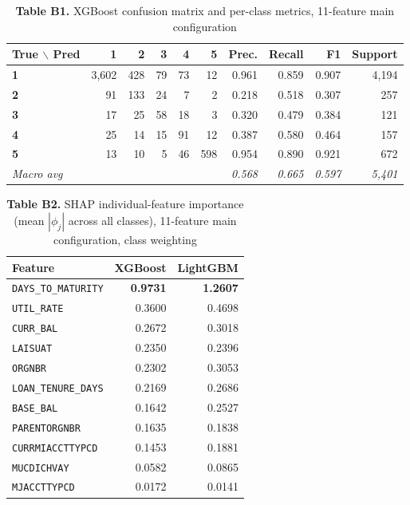 \documentclass[11pt,a4paper]{article}
\begin{document}
\begin{table}[H]
\centering
\caption*{\small\textbf{Table B1.} XGBoost confusion matrix and per-class metrics, 11-feature main configuration}
\small
\begin{tabular}{lrrrrrrrrr}
\toprule
True $\backslash$ Pred & 1 & 2 & 3 & 4 & 5 & Prec. & Recall & F1 & Support \\
\midrule
\textbf{1} & 3,602 & 428 & 79 & 73 & 12 & 0.961 & 0.859 & 0.907 & 4,194 \\
\textbf{2} & 91 & 133 & 24 & 7 & 2 & 0.218 & 0.518 & 0.307 & 257 \\
\textbf{3} & 17 & 25 & 58 & 18 & 3 & 0.320 & 0.479 & 0.384 & 121 \\
\textbf{4} & 25 & 14 & 15 & 91 & 12 & 0.387 & 0.580 & 0.464 & 157 \\
\textbf{5} & 13 & 10 & 5 & 46 & 598 & 0.954 & 0.890 & 0.921 & 672 \\
\midrule
\textit{Macro avg} & & & & & & \textit{0.568} & \textit{0.665} & \textit{0.597} & \textit{5,401} \\
\bottomrule
\end{tabular}
\end{table}

\begin{table}[H]
\centering
\caption*{\small\textbf{Table B2.} SHAP individual-feature importance (mean $|\phi_j|$ across all classes), 11-feature main configuration, class weighting}
\begin{tabular}{lrr}
\toprule
Feature & XGBoost & LightGBM \\
\midrule
\texttt{DAYS\_TO\_MATURITY} & \textbf{0.9731} & \textbf{1.2607} \\
\texttt{UTIL\_RATE}         & 0.3600 & 0.4698 \\
\texttt{CURR\_BAL}          & 0.2672 & 0.3018 \\
\texttt{LAISUAT}            & 0.2350 & 0.2396 \\
\texttt{ORGNBR}             & 0.2302 & 0.3053 \\
\texttt{LOAN\_TENURE\_DAYS} & 0.2169 & 0.2686 \\
\texttt{BASE\_BAL}          & 0.1642 & 0.2527 \\
\texttt{PARENTORGNBR}       & 0.1635 & 0.1838 \\
\texttt{CURRMIACCTTYPCD}    & 0.1453 & 0.1881 \\
\texttt{MUCDICHVAY}         & 0.0582 & 0.0865 \\
\texttt{MJACCTTYPCD}        & 0.0172 & 0.0141 \\
\bottomrule
\end{tabular}
\end{table}
\end{document}
